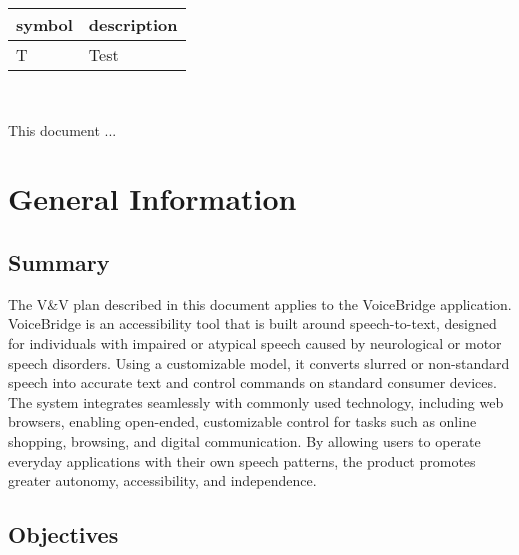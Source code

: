 \documentclass[12pt, titlepage]{article}
\begin{document}
\renewcommand{\arraystretch}{1.2}
\begin{tabular}{l l} 
  \toprule		
  \textbf{symbol} & \textbf{description}\\
  \midrule 
  T & Test\\
  \bottomrule
\end{tabular}\\



\newpage


This document ... 

\section{General Information}

\subsection{Summary}

The V\&V plan described in this document applies to the VoiceBridge application. VoiceBridge is an accessibility tool that is built around speech-to-text, designed for individuals with impaired or atypical speech caused by neurological or motor speech disorders. Using a customizable model, it converts slurred or non-standard speech into accurate text and control commands on standard consumer devices. The system integrates seamlessly with commonly used technology, including web browsers, enabling open-ended, customizable control for tasks such as online shopping, browsing, and digital communication. By allowing users to operate everyday applications with their own speech patterns, the product promotes greater autonomy, accessibility, and independence.

\subsection{Objectives}
\end{document}
